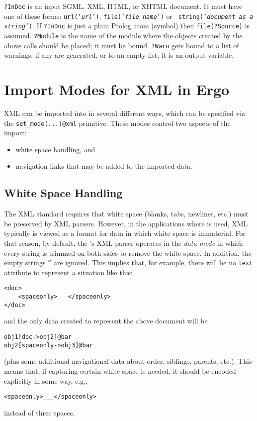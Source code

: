 {\tt ?InDoc} is an input SGML, XML, HTML, or XHTML document.
It must have one of these forms: {\tt url({\textnormal{'\emph{url}'}})},
{\tt file(\textnormal{'\emph{file name}'})} or {\tt
  string(\textnormal{'\emph{document as a string}}')}.  If \texttt{?InDoc}
is just a plain Prolog atom (\FLSYSTEM symbol) then \texttt{file(?Source)}
is assumed.  
{\tt ?Module} is the name of the \FLSYSTEM module where the objects created
by the above calls  should be placed; it must be bound.
{\tt ?Warn} gets bound to a list of warnings, if any are generated, or to
an empty list; it is an output variable.

  
\section{Import Modes for XML in Ergo}

XML can be imported into \FLSYSTEM in several different ways, which can be
specified via the \texttt{set\_mode(...)@\bs{}xml}  primitive. These modes
control two aspects of the import:
\begin{itemize}
\item  white space handling, and
\item  navigation links that may be added to the imported data.
\end{itemize}

\subsection{White Space Handling}

The XML standard requires that white space (blanks, tabs, newlines, etc.)
must be preserved by XML parsers. However, in the applications
where \FLSYSTEM is used, XML typically is viewed as a format for data in
which white space is immaterial. For that reason, by default, the
\FLSYSTEM's XML parser operates in the \emph{data mode} in which every
string is trimmed on both sides to remove the white space. In addition, the
empty strings \texttt{''} are ignored.    
This implies that, for example, there will be no \texttt{\bs{}text}
attribute to represent a situation like this:
\begin{verbatim}
<doc>
    <spaceonly>   </spaceonly>
</doc>
\end{verbatim}
and the only data created to represent the above document will be 
\begin{verbatim}
obj1[doc->obj2]@bar
obj2[spaceonly->obj3]@bar
\end{verbatim}
(plus some additional navigational data about order, siblings, parents,
etc.).
This means that, if capturing certain white space is needed, it should be
encoded explicitly in some way, e.g., 
\begin{verbatim}
<spaceonly>___</spaceonly>
\end{verbatim}
instead of three spaces.

